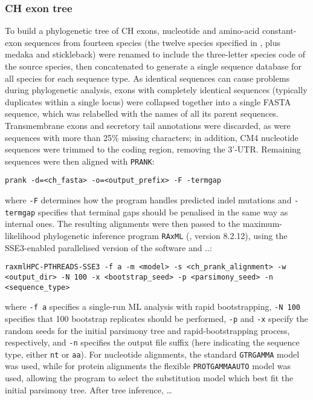 \subsubsection{CH exon tree}
\label{sec:phylo_methods_ch}


To build a phylogenetic tree of CH exons, nucleotide and amino-acid constant-exon sequences from fourteen species (the twelve species specified in , plus medaka and stickleback) were renamed to include the three-letter species code of the source species, then concatenated to generate a single sequence database for all species for each sequence type. As identical sequences can cause problems during phylogenetic analysis, exons with completely identical sequences (typically duplicates within a single locus) were collapsed together into a single FASTA sequence, which was relabelled with the names of all its parent sequences. Transmembrane exons and secretory tail annotations were discarded, as were sequences with more than 25\% missing characters; in addition, CM4 nucleotide sequences were trimmed to the coding region, removing the 3'-UTR. Remaining sequences were then aligned with \lstinline{PRANK}:

\begin{lstlisting}
prank -d=<ch_fasta> -o=<output_prefix> -F -termgap
\end{lstlisting}

where \lstinline{-F} determines how the program handles predicted indel mutations and \lstinline{-termgap} specifies that terminal gaps should be penalised in the same way as internal ones. The resulting alignments were then passed to the maximum-likelihood phylogenetic inference program \lstinline{RAxML} (\parencite{stamatakis2005raxml3,stamatakis2006raxml6,stamatakis2014raxml8}, version 8.2.12), using the SSE3-enabled parallelised version of the software and ..:

\begin{lstlisting}
raxmlHPC-PTHREADS-SSE3 -f a -m <model> -s <ch_prank_alignment> -w <output_dir> -N 100 -x <bootstrap_seed> -p <parsimony_seed> -n <sequence_type>
\end{lstlisting}

where \lstinline{-f a} specifies a single-run ML analysis with rapid bootstrapping, \lstinline{-N 100} specifies that 100 bootstrap replicates should be performed, \lstinline{-p} and \lstinline{-x} specify the random seeds for the initial parsimony tree and rapid-bootstrapping process, respectively, and  \lstinline{-n} specifies the output file suffix (here indicating the sequence type, either \lstinline{nt} or \lstinline{aa}). For nucleotide alignments, the standard \lstinline{GTRGAMMA} model was used, while for protein alignments the flexible \lstinline{PROTGAMMAAUTO} model was used, allowing the program to select the substitution model which best fit the initial parsimony tree. After tree inference, \dots %

